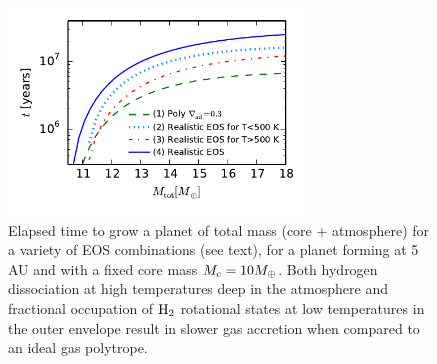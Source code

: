 

\begin{figure}[H]
\centering
\includegraphics[width=0.7\textwidth]{figures/tplot.pdf}
\caption{Elapsed time to grow a planet of total mass (core + atmosphere) for a variety of EOS combinations (see text), for a planet forming at 5 AU and with a fixed core mass $M_{\rm c}=10 M_{\oplus}$. Both hydrogen dissociation at high temperatures deep in the atmosphere and fractional occupation of $\rm H_2$ rotational states at low temperatures in the outer envelope result in slower gas accretion when compared to an ideal gas polytrope.}
\label{fig:tplotall}
\end{figure}







